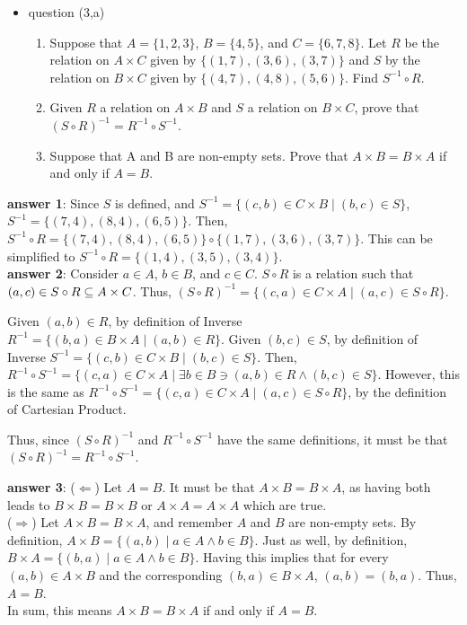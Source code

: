 \documentclass[12pt]{article}
\begin{document}
\begin{itemize}
\item question (3,a)
\begin{enumerate}
\item Suppose that \(A=\{1,2,3\}\), \(B=\{4,5\}\), and \(C=\{6,7,8\}\). Let \(R\) be the
relation on \(A\times{}C\) given by \(\{(1,7),(3,6),(3,7)\}\) and \(S\) by the relation
on \(B\times{}C\) given by \(\{(4,7),(4,8),(5,6)\}\). Find \(S^{-1}\circ{}R\).
\item Given \(R\) a relation on \(A\times{}B\) and \(S\) a relation on \(B\times{}C\), prove that
\((S\circ{}R)^{-1}=R^{-1}\circ{}S^{-1}\).
\item Suppose that A and B are non-empty sets. Prove that \(A\times{}B=B\times{}A\) if and only
if \(A=B\).
\end{enumerate}
\end{itemize}
\textbf{answer 1}: Since \(S\) is defined, and \(S^{-1}=\{(c,b)\in{}C\times{}B\mid{}(b,c)\in{}S\}\),
\(S^{-1}=\{(7,4),(8,4),(6,5)\}\). Then,
\(S^{-1}\circ{}R=\{(7,4),(8,4),(6,5)\}\circ\{(1,7),(3,6),(3,7)\}\). This can be
simplified to \(S^{-1}\circ{}R=\{(1,4),(3,5),(3,4)\}\). \\
\textbf{answer 2}: Consider \(a\in{}A\), \(b\in{}B\), and \(c\in{}C\). \(S\circ{}R\) is a relation such that
\((a,c)\in{}S\circ{}R\subseteq{}A\times{}C\). Thus, \((S\circ{}R)^{-1}=\{(c,a)\in{}C\times{}A\mid{}(a,c)\in{}S\circ{}R\}\).

Given \((a,b)\in{}R\), by definition of Inverse \(R^{-1}=\{(b,a)\in{}B\times{}A\mid{}(a,b)\in{}R\}\).
Given \((b,c)\in{}S\), by definition of Inverse \(S^{-1}=\{(c,b)\in{}C\times{}B\mid{}(b,c)\in{}S\}\).
Then,
\(R^{-1}\circ{}S^{-1}=\{(c,a)\in{}C\times{}A\mid{}\exists{}b\in{}B\ni{}(a,b)\in{}R\land{}(b,c)\in{}S\}\).
However, this is the same as
\(R^{-1}\circ{}S^{-1}=\{(c,a)\in{}C\times{}A\mid{}(a,c)\in{}S\circ{}R\}\), by the
definition of Cartesian Product.

Thus, since \((S\circ{}R)^{-1}\) and \(R^{-1}\circ{}S^{-1}\) have the same definitions, it must be
that \((S\circ{}R)^{-1}=R^{-1}\circ{}S^{-1}\).

\textbf{answer 3}: (\(\Leftarrow\)) Let \(A=B\). It must be that \(A\times{}B=B\times{}A\), as having both leads to
\(B\times{}B=B\times{}B\) or \(A\times{}A=A\times{}A\) which are true. \\
(\(\Rightarrow\)) Let \(A\times{}B=B\times{}A\), and remember \(A\) and \(B\) are non-empty sets. By definition,
\(A\times{}B=\{(a,b)\mid{}a\in{}A\land{}b\in{}B\}\). Just as well, by definition,
\(B\times{}A=\{(b,a)\mid{}a\in{}A\land{}b\in{}B\}\). Having this implies that for every \((a,b)\in{}A\times{}B\) and
the corresponding \((b,a)\in{}B\times{}A\), \((a,b)=(b,a)\). Thus, \(A=B\). \\
In sum, this means \(A\times{}B=B\times{}A\) if and only if \(A=B\).
\end{document}
